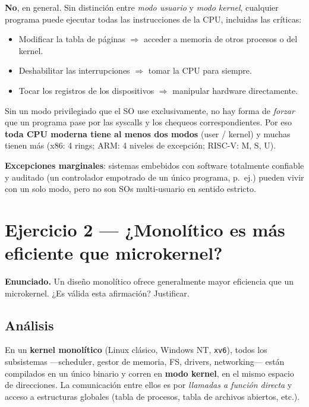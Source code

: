 \documentclass[11pt,a4paper]{article}
\begin{document}
\begin{respuesta}
\textbf{No}, en general. Sin distinción entre \emph{modo usuario} y
\emph{modo kernel}, cualquier programa puede ejecutar todas las
instrucciones de la CPU, incluidas las críticas:

\begin{itemize}[leftmargin=*,nosep]
    \item Modificar la tabla de páginas $\Rightarrow$ acceder a
        memoria de otros procesos o del kernel.
    \item Deshabilitar las interrupciones $\Rightarrow$ tomar la CPU
        para siempre.
    \item Tocar los registros de los dispositivos $\Rightarrow$
        manipular hardware directamente.
\end{itemize}

Sin un modo privilegiado que el SO use exclusivamente, no hay forma
de \emph{forzar} que un programa pase por las syscalls y los chequeos
correspondientes. Por eso \textbf{toda CPU moderna tiene al menos dos
modos} (user / kernel) y muchas tienen más (x86: 4 rings; ARM: 4
niveles de excepción; RISC-V: M, S, U).

\textbf{Excepciones marginales}: sistemas embebidos con software
totalmente confiable y auditado (un controlador empotrado de un
único programa, p.\ ej.) pueden vivir con un solo modo, pero no son
SOs multi-usuario en sentido estricto.
\end{respuesta}

\section{Ejercicio 2 --- ¿Monolítico es más eficiente que microkernel?}

\textbf{Enunciado.} Un diseño monolítico ofrece generalmente mayor
eficiencia que un microkernel. ¿Es válida esta afirmación? Justificar.

\subsection*{Análisis}

En un \textbf{kernel monolítico} (Linux clásico, Windows NT,
\texttt{xv6}), todos los subsistemas ---scheduler, gestor de memoria,
FS, drivers, networking--- están compilados en un único binario y
corren en \textbf{modo kernel}, en el mismo espacio de direcciones.
La comunicación entre ellos es por \emph{llamadas a función directa}
y acceso a estructuras globales (tabla de procesos, tabla de archivos
abiertos, etc.).
\end{document}
